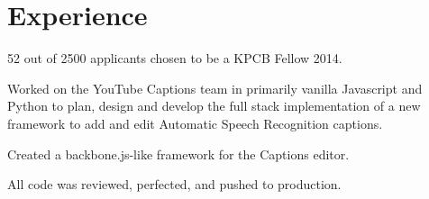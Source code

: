 \documentclass[]{uniqueness_cv}
\begin{document}
\begin{minipage}[t]{0.66\textwidth} 


\section{ \textcolor{gray}{} Experience}

\vspace{\topsep} %
\begin{tightemize}\item 52 out of 2500 applicants chosen to be a KPCB Fellow 2014.
\end{tightemize}
\sectionsep

\begin{tightemize}
\item Worked on the YouTube Captions team in primarily vanilla Javascript and Python to plan, design and develop the full stack implementation of a new framework to add and edit Automatic Speech Recognition captions.\item Created a backbone.js-like framework for the Captions editor.\item All code was reviewed, perfected, and pushed to production.\end{tightemize}
\sectionsep

\end{minipage}
\end{document}
